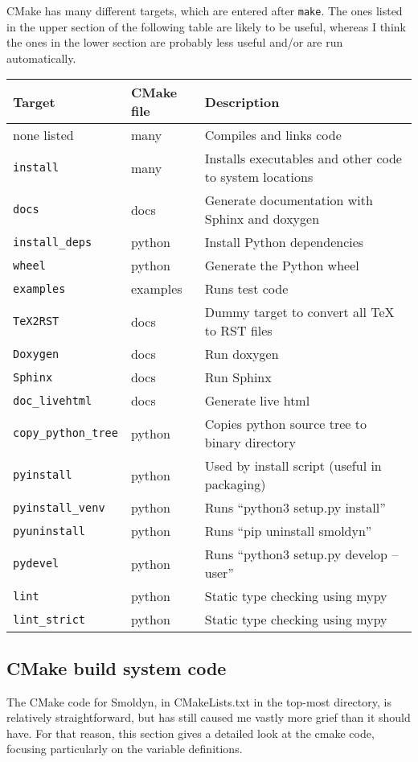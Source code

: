 \documentclass {scrbook}
\newcommand {\ttt} {\texttt}
\begin{document}
CMake has many different targets, which are entered after \ttt{make}. The ones listed in the upper section of the following table are likely to be useful, whereas I think the ones in the lower section are probably less useful and/or are run automatically.

\begin{longtable}[c]{lll}
Target & CMake file & Description\\
\hline
none listed & many & Compiles and links code\\
\ttt{install} & many & Installs executables and other code to system locations\\
\ttt{docs} & docs & Generate documentation with Sphinx and doxygen\\
\ttt{install\_deps} & python & Install Python dependencies\\
\ttt{wheel} & python & Generate the Python wheel\\
\ttt{examples} & examples & Runs test code\\
\hline
\ttt{TeX2RST} & docs & Dummy target to convert all TeX to RST files\\
\ttt{Doxygen} & docs & Run doxygen\\
\ttt{Sphinx} & docs & Run Sphinx\\
\ttt{doc\_livehtml} & docs & Generate live html\\
\ttt{copy\_python\_tree} & python & Copies python source tree to binary directory\\
\ttt{pyinstall} & python & Used by install script (useful in packaging)\\
\ttt{pyinstall\_venv} & python & Runs ``python3 setup.py install''\\
\ttt{pyuninstall} & python & Runs ``pip uninstall smoldyn''\\
\ttt{pydevel} & python & Runs ``python3 setup.py develop --user''\\
\ttt{lint} & python & Static type checking using mypy\\
\ttt{lint\_strict} & python & Static type checking using mypy\\
\end{longtable}


\subsection{CMake build system code}

The CMake code for Smoldyn, in CMakeLists.txt in the top-most directory, is relatively straightforward, but has still caused me vastly more grief than it should have. For that reason, this section gives a detailed look at the cmake code, focusing particularly on the variable definitions.
\end{document}

